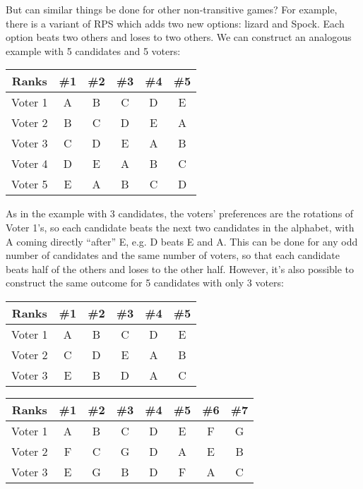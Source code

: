 \documentclass{article}
\begin{document}
But can similar things be done for other non-transitive games?
For example, there is a variant of RPS
which adds two new options: lizard and Spock.
Each option beats two others and loses to two others.
We can construct an analogous example with 5 candidates and 5 voters:

\begin{center}
  \begin{tabular}{|c|c c c c c|}
    \hline
    Ranks & \#1 & \#2 & \#3 & \#4 & \#5 \\ \hline
    Voter 1 & A & B & C & D & E \\ \hline
    Voter 2 & B & C & D & E & A \\ \hline
    Voter 3 & C & D & E & A & B \\ \hline
    Voter 4 & D & E & A & B & C \\ \hline
    Voter 5 & E & A & B & C & D \\ \hline
  \end{tabular}
\end{center}

As in the example with 3 candidates,
the voters' preferences are the rotations of Voter 1's,
so each candidate beats the next two candidates in the alphabet,
with A coming directly ``after'' E,
e.g. D beats E and A.
This can be done for any odd number of candidates and the same number of voters,
so that each candidate beats half of the others and loses to the other half.
However, it's also possible to construct the same outcome for 5 candidates
with only 3 voters:
\begin{center}
  \begin{tabular}{|c|c c c c c|}
    \hline
    Ranks & \#1 & \#2 & \#3 & \#4 & \#5 \\ \hline
    Voter 1 & A & B & C & D & E \\ \hline
    Voter 2 & C & D & E & A & B \\ \hline
    Voter 3 & E & B & D & A & C \\ \hline    
  \end{tabular}
\end{center}

\begin{center}
  \begin{tabular}{|c|c c c c c c c|}
    \hline
    Ranks & \#1 & \#2 & \#3 & \#4 & \#5 & \#6 & \#7 \\ \hline
    Voter 1 & A & B & C & D & E & F & G \\ \hline
    Voter 2 & F & C & G & D & A & E & B \\ \hline
    Voter 3 & E & G & B & D & F & A & C \\ \hline
  \end{tabular}
\end{center}
\end{document}
